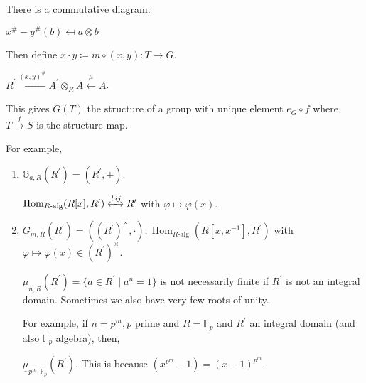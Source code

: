 \documentclass{article}
\theoremstyle{definition}
\numberwithin{theorem}{subsection}
\begin{document}
    There is a commutative diagram:

    \begin{center}
    \end{center}

    \(x^\# - y^\# (b) \mapsfrom a \otimes b\)

    \begin{center}
    \end{center}

    Then define \(x \cdot y \coloneqq m \circ (x,y): T \to G\).
    
    \(R^{\prime} \xleftarrow{(x,y)^\#} A^{\prime} \otimes_R A \xleftarrow{\mu} A\). 

    This gives \(G(T)\) the structure of a group with unique element \(e_G \circ f\) where \(T \xrightarrow{f} S\) is the structure map.

    For example,

    \begin{enumerate}[label=\arabic*)]
        \item \(\mathbb{G}_{a,R}(R^{\prime}) = (R^{\prime},+)\).
        
        \(\operatorname{Hom}_{R\text{-alg}}(R[x],R^{\prime}) \xleftrightarrow{bij} R^{\prime} \) with \(\varphi \mapsto \varphi(x)\).
        
        \item \(G_{m,R}(R^{\prime}) = ((R^{\prime})^\times, \cdot), \operatorname{Hom}_{R\text{-alg}}(R[x,x ^{-1}], R^{\prime})\) with \(\varphi \mapsto \varphi (x) \in (R^{\prime})^\times\).
        
        \(\underline{\mu}_{n,R}(R^{\prime}) = \{ a\in R^{\prime} \mid a^n = 1 \}  \) is not necessarily finite if \(R^{\prime}\) is not an integral domain. Sometimes we also have very few roots of unity.
        
        For example, if \(n = p^m, p\) prime and \(R = \mathbb{F}_p\) and \(R^{\prime}\) an integral domain (and also \(\mathbb{F}_p\) algebra), then,

        \(\underline{\mu}_{p^m, \mathbb{F}_p}(R^{\prime})\). This is because \((x^{p^m}-1) = (x-1)^{p^m}\).
    
    \end{enumerate} 
\end{document}
